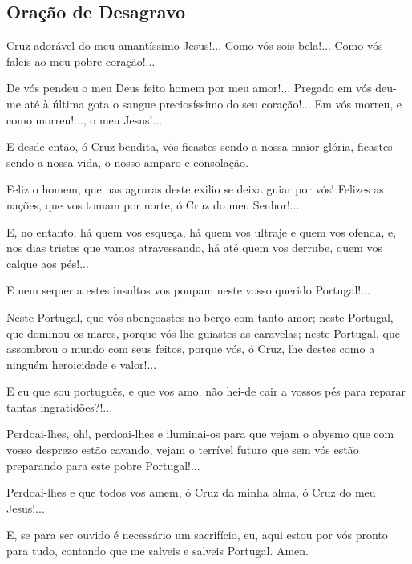 \subsection{Oração de Desagravo}
 Cruz adorável do meu amantíssimo Jesus!... Como vós sois bela!... Como vós faleis ao meu pobre coração!...\par
De vós pendeu o meu Deus feito homem por meu amor!... Pregado em vós deu-me até à última gota o sangue preciosíssimo do seu coração!... Em vós morreu, e como morreu!..., o meu Jesus!...\par
E desde então, ó Cruz bendita, vós ficastes sendo a nossa maior glória, ficastes sendo a nossa vida, o nosso amparo e consolação.\par
Feliz o homem, que nas agruras deste exilio se deixa guiar por vós! Felizes as nações, que vos tomam por norte, ó Cruz do meu Senhor!...\par
E, no entanto, há quem vos esqueça, há quem vos ultraje e quem vos ofenda, e, nos dias tristes que vamos atravessando, há até quem vos derrube, quem vos calque aos pés!...\par
E nem sequer a estes insultos vos poupam neste vosso querido Portugal!...\par
Neste Portugal, que vós abençoastes no berço com tanto amor; neste Portugal, que dominou os mares, porque vós lhe guiastes as caravelas; neste Portugal, que assombrou o mundo com seus feitos, porque vós, ó Cruz, lhe destes como a ninguém heroicidade e valor!...\par
E eu que sou português, e que vos amo, não hei-de cair a vossos pés para reparar tantas ingratidões?!...\par
Perdoai-lhes, oh!, perdoai-lhes e iluminai-os para que vejam o abysmo que com vosso desprezo estão cavando, vejam o terrível futuro que sem vós estão preparando para este pobre Portugal!...\par
Perdoai-lhes e que todos vos amem, ó Cruz da minha alma, ó Cruz do meu Jesus!...\par
E, se para ser ouvido é necessário um sacrifício, eu, aqui estou por vós pronto para tudo, contando que me salveis e salveis Portugal. Amen.
